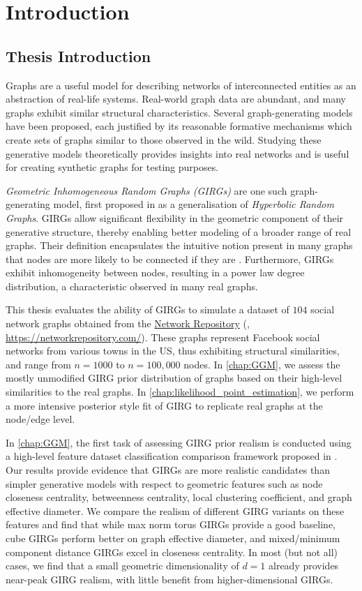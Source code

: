 \chapter{Introduction}
\label{chap:introduction}
\section{Thesis Introduction}
Graphs are a useful model for describing networks of interconnected entities as an abstraction of real-life systems. Real-world graph data are abundant, and many graphs exhibit similar structural characteristics. Several graph-generating models have been proposed, each justified by its reasonable formative mechanisms which create sets of graphs similar to those observed in the wild. Studying these generative models theoretically provides insights into real networks and is useful for creating synthetic graphs for testing purposes.

\textit{Geometric Inhomogeneous Random Graphs (GIRGs)} are one such graph-generating model, first proposed in \cite{bringmann2016average} as a generalisation of \textit{Hyperbolic Random Graphs}. GIRGs allow significant flexibility in the geometric component of their generative structure, thereby enabling better modeling of a broader range of real graphs. Their definition encapsulates the intuitive notion present in many graphs that nodes are more likely to be connected if they are . Furthermore, GIRGs exhibit inhomogeneity between nodes, resulting in a power law degree distribution, a characteristic observed in many real graphs.

This thesis evaluates the ability of GIRGs to simulate a dataset of $104$ social network graphs obtained from the \href{https://networkrepository.com/}{Network Repository} (\cite{rossi2015network}, \url{https://networkrepository.com/}). These graphs represent Facebook social networks from various towns in the US, thus exhibiting structural similarities, and range from $n=1000$ to $n=100,000$ nodes. In \cref{chap:GGM}, we assess the mostly unmodified GIRG prior distribution of graphs based on their high-level similarities to the real graphs. In \cref{chap:likelihood_point_estimation}, we perform a more intensive posterior style fit of GIRG to replicate real graphs at the node/edge level.

In \cref{chap:GGM}, the first task of assessing GIRG prior realism is conducted using a high-level feature dataset classification comparison framework proposed in \cite{blasius2018towards}. Our results provide evidence that GIRGs are more realistic candidates than simpler generative models with respect to geometric features such as node closeness centrality, betweenness centrality, local clustering coefficient, and graph effective diameter.
We compare the realism of different GIRG variants on these features and find that while max norm torus GIRGs provide a good baseline, cube GIRGs perform better on graph effective diameter, and mixed/minimum component distance GIRGs excel in closeness centrality.
In most (but not all) cases, we find that a small geometric dimensionality of $d=1$ already provides near-peak GIRG realism, with little benefit from higher-dimensional GIRGs.

